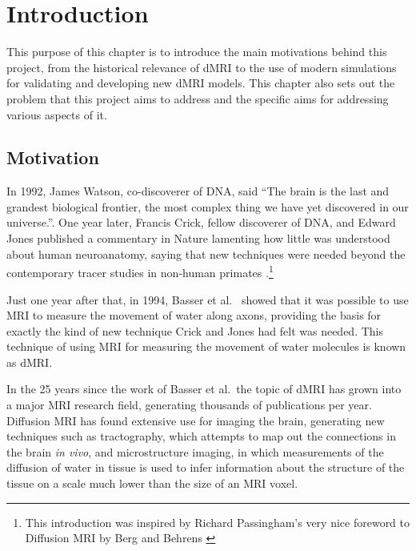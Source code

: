 \renewcommand{\LifeChapter}{y}
\chapter{Introduction}
\label{chap:introduction}

\chaptertoc{}

\begin{chapterabstract}
  This purpose of this chapter is to introduce the main motivations behind this project, from the historical relevance of \acl{dMRI} to the use of modern simulations for validating and developing new \acl{dMRI} models.
  This chapter also sets out the problem that this project aims to address and the specific aims for addressing various aspects of it.
\end{chapterabstract}

\section{Motivation}
\label{sec:intro_motivation}
In 1992, James Watson, co-discoverer of DNA, said ``The brain is the last and grandest biological frontier, the most complex thing we have yet discovered in our universe.''\cite{NAP1785}.
One year later, Francis Crick, fellow discoverer of DNA, and Edward Jones published a commentary in Nature lamenting how little was understood about human neuroanatomy, saying that new techniques were needed beyond the contemporary tracer studies in non-human primates \cite{Crick1993}.\footnote{This introduction was inspired by Richard Passingham's very nice foreword to Diffusion MRI by Berg and Behrens \cite{Johansen-Berg2013}}

Just one year after that, in 1994, Basser et al.\ \cite{Basser1994} showed that it was possible to use \ac{MRI} to measure the movement of water along axons, providing the basis for exactly the kind of new technique Crick and Jones had felt was needed.
This technique of using \ac{MRI} for measuring the movement of water molecules is known as \ac{dMRI}.

In the 25 years since the work of Basser et al.\ the topic of \acl{dMRI} has grown into a major \ac{MRI} research field, generating thousands of publications per year.
Diffusion MRI has found extensive use for imaging the brain, generating new techniques such as tractography, which attempts to map out the connections in the brain \emph{in vivo}, and microstructure imaging, in which measurements of the diffusion of water in tissue is used to infer information about the structure of the tissue on a scale much lower than the size of an MRI voxel.


